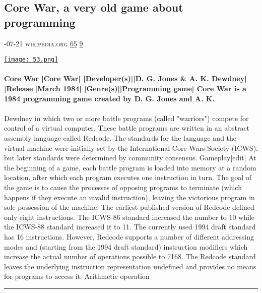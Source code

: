 \documentclass[10pt,a4paper]{article}
\begin{document}
\begin{multicols*}{2}
\begin{minipage}{\linewidth}
\subsection{Core War, a very old game about programming}
\textsc{\footnotesize
{\scriptsize\faCalendar}-07-21 
{\scriptsize\faGlobe}\space 
wikipedia.org 
{\scriptsize\faThumbsOUp}\space 
\href{http://news.ycombinator.com/item?id=37117469\&utm\_term=comment}{65} 
{\scriptsize\faComments}\space 
\href{http://news.ycombinator.com/item?id=37117469\&utm\_term=comment}{9} 
}
\par\medskip\noindent
\href{https://en.wikipedia.org/wiki/Core\_War?utm\_source=hackernewsletter\&utm\_medium=email\&utm\_term=learn}{
    \texttt{[image: 53.png]}
}
\end{minipage}
\paragraph{}
\textbf{Core War
|Core War|
|Developer(s)||D. G. Jones \& A. K. Dewdney|
|Release||March 1984|
|Genre(s)||Programming game|
Core War is a 1984 programming game created by D. G. Jones and A. K.}
\paragraph{}
 Dewdney in which two or more battle programs (called "warriors") compete for control of a virtual computer. These battle programs are written in an abstract assembly language called Redcode. The standards for the language and the virtual machine were initially set by the International Core Wars Society (ICWS), but later standards were determined by community consensus.
Gameplay[edit]
At the beginning of a game, each battle program is loaded into memory at a random location, after which each program executes one instruction in turn. The goal of the game is to cause the processes of opposing programs to terminate (which happens if they execute an invalid instruction), leaving the victorious program in sole possession of the machine.
The earliest published version of Redcode defined only eight instructions. The ICWS-86 standard increased the number to 10 while the ICWS-88 standard increased it to 11. The currently used 1994 draft standard has 16 instructions. However, Redcode supports a number of different addressing modes and (starting from the 1994 draft standard) instruction modifiers which increase the actual number of operations possible to 7168. The Redcode standard leaves the underlying instruction representation undefined and provides no means for programs to access it. Arithmetic operation
\par\noindent\textcolor{red}{\rule{\linewidth}{0.2mm}}
\vfill
\null
\end{multicols*}
\end{document}
